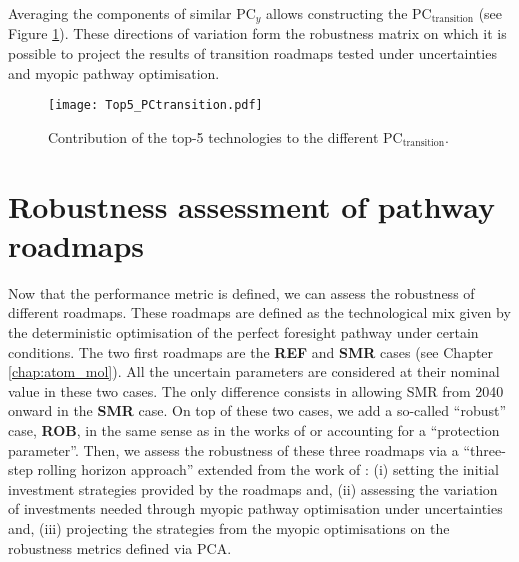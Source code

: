 Averaging the components of similar $\text{PC}_y$ allows constructing the $\text{PC}_{\text{transition}}$ (see Figure \ref{fig:Top5_PC_transition}). These directions of variation form the robustness matrix on which it is possible to project the results of transition roadmaps tested under uncertainties and myopic pathway optimisation.

\begin{figure}[!htbp]
\centering
\texttt{[image: Top5\_PCtransition.pdf]}
\caption{Contribution of the top-5 technologies to the different $\text{PC}_{\text{transition}}$. }
\label{fig:Top5_PC_transition}
\end{figure}

\newpage
\section{Robustness assessment of pathway roadmaps}
\label{sec:RobPol:Rob_Assessment}
Now that the performance metric is defined, we can assess the robustness of different roadmaps. These roadmaps are defined as the technological mix given by the deterministic optimisation of the perfect foresight pathway under certain conditions. The two first roadmaps are the \textbf{REF} and \textbf{SMR} cases (see Chapter \ref{chap:atom_mol}). All the uncertain parameters are considered at their nominal value in these two cases. The only difference consists in allowing \gls{SMR} from 2040 onward in the \textbf{SMR} case. On top of these two cases, we add a so-called ``robust'' case, \textbf{ROB}, in the same sense as in the works of \citet{bertsimas2004price} or \citet{Moret2017PhDThesis} accounting for a ``protection parameter''. Then, we assess the robustness of these three roadmaps via a ``three-step rolling horizon approach'' extended from the work of \citet{moret2020overcapacity}: (i) setting the initial investment strategies provided by the roadmaps and, (ii) assessing the variation of investments needed through myopic pathway optimisation under uncertainties and, (iii) projecting the strategies from the myopic optimisations on the robustness metrics defined via \gls{PCA}.

